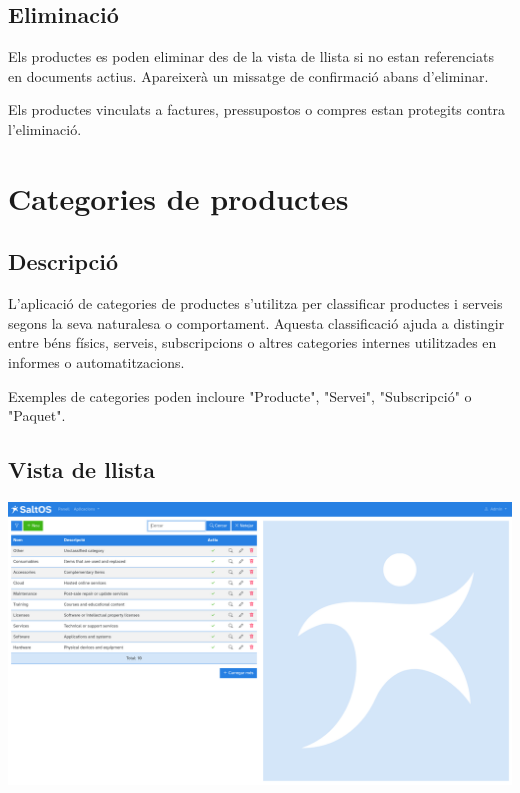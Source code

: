 \documentclass[a4paper]{article}
\begin{document}
\hypertarget{toc155}{}
\subsection{Eliminació}

Els productes es poden eliminar des de la vista de llista si no estan referenciats en documents actius.
Apareixerà un missatge de confirmació abans d'eliminar.

Els productes vinculats a factures, pressupostos o compres estan protegits contra l'eliminació.


\hypertarget{toc156}{}
\section{Categories de productes}

\hypertarget{toc157}{}
\subsection{Descripció}

L'aplicació de categories de productes s'utilitza per classificar productes i serveis segons la seva naturalesa o comportament.
Aquesta classificació ajuda a distingir entre béns físics, serveis, subscripcions o altres categories internes utilitzades en informes o automatitzacions.

Exemples de categories poden incloure "Producte", "Servei", "Subscripció" o "Paquet".

\hypertarget{toc158}{}
\subsection{Vista de llista}

\begin{center}\includegraphics[width=1\textwidth]{../ujest/snaps/test-screenshots-js-screenshots-sales-products-categories-list-ca-es-1-snap.png}\end{center}
\end{document}

